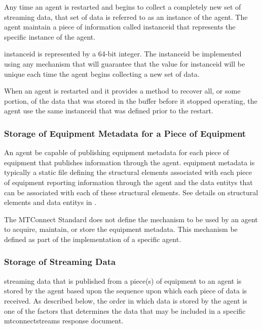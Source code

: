 \documentclass{mtconnect}	%
\begin{document}
Any time an \gls{agent} is restarted and begins to collect a completely new set of \gls{streaming data}, that set of data is referred to as an \gls{instance} of the \gls{agent}.  The \gls{agent} \MUST maintain a piece of information called \gls{instanceid} that represents the specific \gls{instance} of the \gls{agent}.

\gls{instanceid} is represented by a 64-bit integer.  The \gls{instanceid} \MAY be implemented using any mechanism that will guarantee that the value for \gls{instanceid} will be unique each time the \gls{agent} begins collecting a new set of data.

When an \gls{agent} is restarted and it provides a method to recover all, or some portion, of the data that was stored in the \gls{buffer} before it stopped operating, the \gls{agent} \MUST use the same \gls{instanceid} that was defined prior to the restart. 

\subsubsection{Storage of Equipment Metadata for a Piece of Equipment}

An \gls{agent} \MUST be capable of publishing \gls{equipment metadata} for each piece of equipment that publishes information through the \gls{agent}.  \gls{equipment metadata} is typically a static file defining the \glspl{structural element} associated with each piece of equipment reporting information through the \gls{agent} and the \glspl{data entity} that can be associated with each of these \glspl{structural element}.  See details on \glspl{structural element} and \glspl{data entity} in .

The MTConnect Standard does not define the mechanism to be used by an \gls{agent} to acquire, maintain, or store the \gls{equipment metadata}.  This mechanism \MUST be defined as part of the implementation of a specific \gls{agent}.

\subsubsection{Storage of Streaming Data}

\gls{streaming data} that is published from a piece(s) of equipment to an \gls{agent} is stored by the \gls{agent} based upon the sequence upon which each piece of data is received.  As described below, the order in which data is stored by the \gls{agent} is one of the factors that determines the data that may be included in a specific \gls{mtconnectstreams response document}. 
\end{document}
